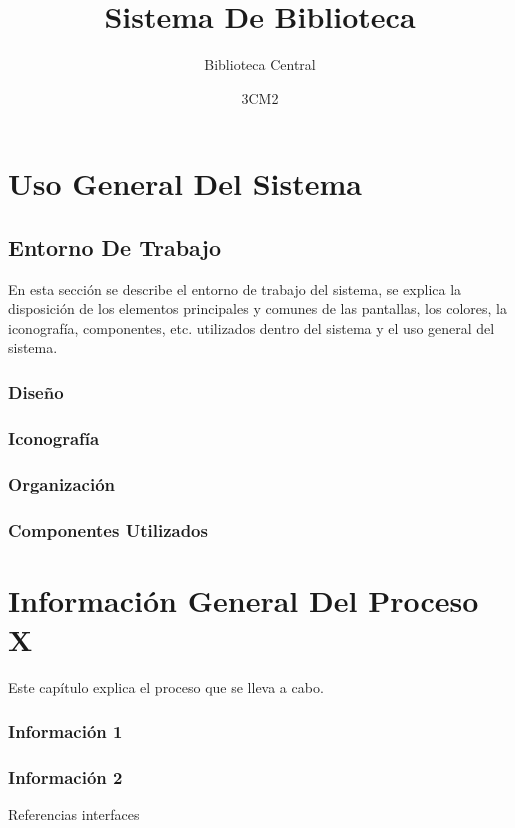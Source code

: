 \documentclass[oneside,10pt]{book}
\title{Sistema De Biblioteca}
\subtitle{Biblioteca Central}
\author{3CM2}
\begin{document}
\maketitle
\frontmatter
\tableofcontents
\mainmatter
\chapter{Uso General Del Sistema}
\section{Entorno De Trabajo}
En esta sección se describe el entorno de trabajo del sistema, se explica la disposición
de los elementos principales y comunes de las pantallas, los colores, la iconografía, componentes, etc.
utilizados dentro del sistema y el uso general del sistema.
\subsection{Diseño}

\subsection{Iconografía}

\subsection{Organización}

\subsection{Componentes Utilizados}

\chapter{Información General Del Proceso X}
Este capítulo explica el proceso que se lleva a cabo.
\subsection{Información 1}

\subsection{Información 2}

Referencias interfaces 
\end{document}
